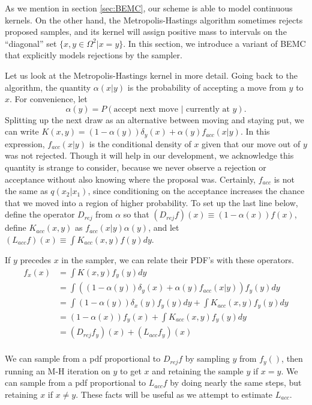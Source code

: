 \documentclass{article}
\begin{document}
As we mention in section \ref{sec:BEMC}, our scheme is able to model continuous kernels. On the other hand, the Metropolis-Hastings algorithm sometimes rejects proposed samples, and its kernel will assign positive mass to intervals on the ``diagonal'' set $\{x,y \in \Omega^2 | x=y\}$. In this section, we introduce a variant of BEMC that explicitly models rejections by the sampler. 

Let us look at the Metropolis-Hastings kernel in more detail. Going back to the algorithm, the quantity $\alpha(x|y)$ is the probability of accepting a move from $y$ to $x$. For convenience, let $$\alpha(y)=P(\text{accept next move $|$ currently at }y).$$ Splitting up the next draw as an alternative between moving and staying put, we can write $K(x, y) = (1-\alpha(y))\delta_{y}(x) + \alpha(y)f_{acc}(x|y)$. In this expression, $f_{acc}(x|y)$ is the conditional density of $x$ given that our move out of $y$ was not rejected. Though it will help in our development, we acknowledge this quantity is strange to consider, because we never observe a rejection or acceptance without also knowing where the proposal was. Certainly, $f_{acc}$ is not the same as $q(x_2|x_1)$, since conditioning on the acceptance increases the chance that we moved into a region of higher probability. To set up the last line below, define the operator $D_{rej}$ from $\alpha$ so that $(D_{rej}f)(x)\equiv (1-\alpha(x))f(x)$, define $K_{acc}(x,y)$ as $f_{acc}(x|y)\alpha(y)$, and let $(L_{acc}f)(x)\equiv \int K_{acc}(x,y)f(y)dy$.

If $y$ precedes $x$ in the sampler, we can relate their PDF's with these operators.
\begin{align*}
 f_x(x) &= \int K(x, y)f_y(y)dy \\
&= \int ((1-\alpha(y))\delta_{y}(x) + \alpha(y)f_{acc}(x|y))f_y(y)dy \\
&= \int (1-\alpha(y))\delta_{x}(y)f_y(y)dy + \int K_{acc}(x,y)f_y(y)dy \\
&=  (1-\alpha(x))f_y(x) + \int K_{acc}(x,y)f_y(y)dy \\
&=  (D_{rej}f_y)(x) + (L_{acc}f_y)(x) \\
\end{align*}

We can sample from a pdf proportional to $D_{rej}f$ by sampling $y$ from $f_y()$, then running an M-H iteration on $y$ to get $x$ and retaining the sample $y$ if $x = y$. We can sample from a pdf proportional to $L_{acc}f$ by doing nearly the same steps, but retaining $x$ if $x \neq y$. These facts will be useful as we attempt to estimate $L_{acc}$.
\end{document}
